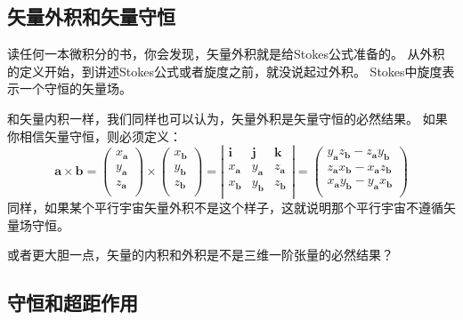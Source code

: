 \subsection{矢量外积和矢量守恒}

读任何一本微积分的书，你会发现，矢量外积就是给Stokes公式准备的。
从外积的定义开始，到讲述Stokes公式或者旋度之前，就没说起过外积。
Stokes中旋度表示一个守恒的矢量场。

和矢量内积一样，我们同样也可以认为，矢量外积是矢量守恒的必然结果。
如果你相信矢量守恒，则必须定义：
\[
\boldsymbol{a}\times \boldsymbol{b}=\left( \begin{array}{c}
	x_{\boldsymbol{a}}\\
	y_{\boldsymbol{a}}\\
	z_{\boldsymbol{a}}\\
\end{array} \right) \times \left( \begin{array}{c}
	x_{\boldsymbol{b}}\\
	y_{\boldsymbol{b}}\\
	z_{\boldsymbol{b}}\\
\end{array} \right) =\left| \begin{matrix}
	\mathbf{i}&		\mathbf{j}&		\mathbf{k}\\
	x_{\boldsymbol{a}}&		y_{\boldsymbol{a}}&		z_{\boldsymbol{a}}\\
	x_{\boldsymbol{b}}&		y_{\boldsymbol{b}}&		z_{\boldsymbol{b}}\\
\end{matrix} \right|=\left( \begin{array}{c}
	y_{\boldsymbol{a}}z_{\boldsymbol{b}}-z_{\boldsymbol{a}}y_{\boldsymbol{b}}\\
	z_{\boldsymbol{a}}x_{\boldsymbol{b}}-x_{\boldsymbol{a}}z_{\boldsymbol{b}}\\
	x_{\boldsymbol{a}}y_{\boldsymbol{b}}-y_{\boldsymbol{a}}x_{\boldsymbol{b}}\\
\end{array} \right)
\]
同样，如果某个平行宇宙矢量外积不是这个样子，这就说明那个平行宇宙不遵循矢量场守恒。

\begin{tcolorbox}
或者更大胆一点，矢量的内积和外积是不是三维一阶张量的必然结果？
\end{tcolorbox}

\subsection{守恒和超距作用}

